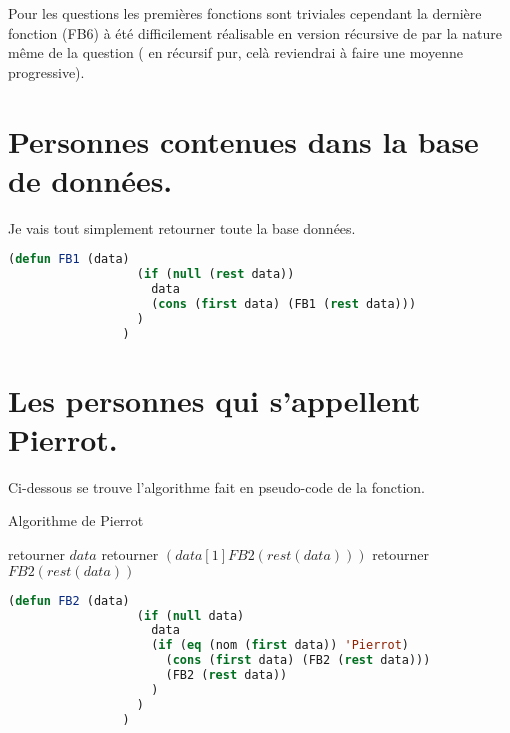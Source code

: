 \documentclass[a4paper, 12pt, leqno]{report}
\theoremstyle{plain}
\begin{document}
            Pour les questions les premières fonctions sont triviales cependant la dernière fonction (FB6) à été difficilement réalisable en version récursive de par la nature même de la question ( en récursif pur, celà reviendrai à faire une moyenne progressive).
           \newpage
              \section{Personnes contenues dans la base de données.}
              Je vais tout simplement retourner toute la base données.
              \begin{lstlisting}[label=some-code,caption=FB1(data),language=lisp]
                (defun FB1 (data) 
                  (if (null (rest data)) 
                    data 
                    (cons (first data) (FB1 (rest data)))
                  )
                )
            \end{lstlisting}
            
            \section{Les personnes qui s'appellent Pierrot.}
        Ci-dessous se trouve l'algorithme fait en pseudo-code de la fonction.
        \begin{algorithm}
            \caption{Algorithme de Pierrot}
            \begin{algorithmic}
                    \State retourner $data$
                    \State retourner $(data[1] FB2(rest(data)))$
                \Else
                    \State retourner $FB2(rest (data))$    
                \EndIf      
            \end{algorithmic}
            \end{algorithm}
            \begin{lstlisting}[label=some-code,caption=FB2(data),language=lisp]
                (defun FB2 (data) 
                  (if (null data) 
                    data 
	                (if (eq (nom (first data)) 'Pierrot) 
	                  (cons (first data) (FB2 (rest data))) 
		              (FB2 (rest data))
		            )
	              )
                )
            \end{lstlisting} 
            \newpage
\end{document}
